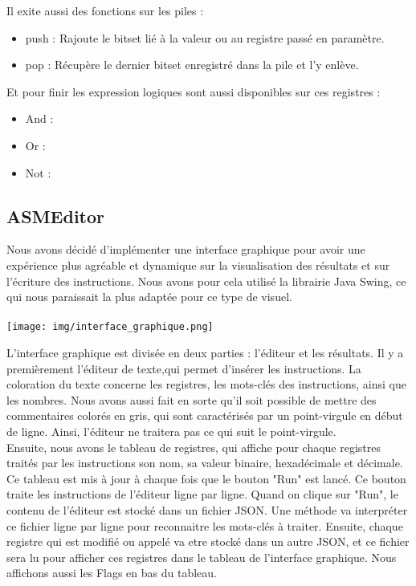 \documentclass{article}
\begin{document}
Il exite aussi des fonctions sur les piles :
\begin{itemize}
    \item push : Rajoute le bitset lié à la valeur ou au registre passé en paramètre.
    \item pop : Récupère le dernier bitset enregistré dans la pile et l'y enlève.
\end{itemize}
Et pour finir les expression logiques sont aussi disponibles sur ces registres :
\begin{itemize}
    \item And :
    \item Or :
    \item Not :
\end{itemize}
\subsection{ASMEditor}

Nous avons décidé d'implémenter une interface graphique pour avoir une expérience plus agréable et dynamique sur la visualisation des résultats et sur
l'écriture des instructions.
Nous avons pour cela utilisé la librairie Java Swing, ce qui nous paraissait la plus adaptée pour ce type de visuel.
\\
\\
\texttt{[image: img/interface\_graphique.png]}

L'interface graphique est divisée en deux parties : l'éditeur et les résultats.
Il y a premièrement l'éditeur de texte,qui permet d'insérer les instructions.
La coloration du texte concerne les registres, les mots-clés des instructions, ainsi que les nombres.
Nous avons aussi fait en sorte qu'il soit possible de mettre des commentaires colorés en gris, qui sont caractérisés par un point-virgule en début de ligne.
Ainsi, l'éditeur ne traitera pas ce qui suit le point-virgule.
\\
Ensuite, nous avons le tableau de registres, qui affiche pour chaque registres traités par les instructions son nom, sa valeur binaire, hexadécimale et décimale.
Ce tableau est mis à jour à chaque fois que le bouton "Run" est lancé.
Ce bouton traite les instructions de l'éditeur ligne par ligne.
Quand on clique sur "Run", le contenu de l'éditeur est stocké dans un fichier JSON.
Une méthode va interpréter ce fichier ligne par ligne pour reconnaitre les mots-clés à traiter.
Ensuite, chaque registre qui est modifié ou appelé va etre stocké dans un autre JSON, et ce fichier sera lu pour afficher ces registres dans le tableau de l'interface graphique.
Nous affichons aussi les Flags en bas du tableau.
\end{document}
